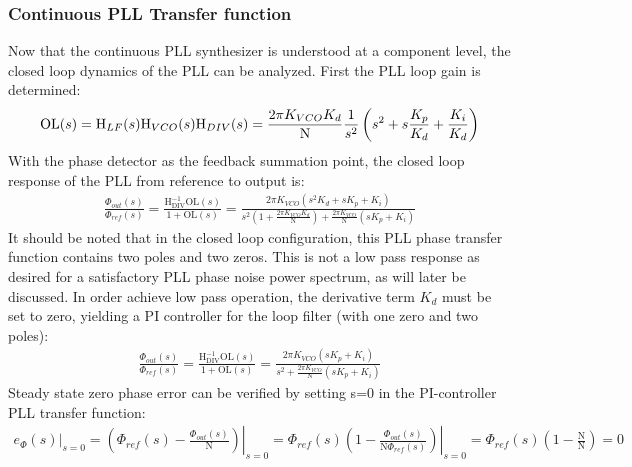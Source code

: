 		\subsubsection{Continuous PLL Transfer function}\label{cont_pll_tf}
			Now that the continuous PLL synthesizer is understood at a component level, the closed loop dynamics of the PLL can be analyzed. First the PLL loop gain is determined:
			\begin{equation}
				\mathrm{OL}(s) = \textnormal{H}_{LF}(s)\textnormal{H}_{VCO}(s)\textnormal{H}_{DIV}(s) = \frac{2\pi K_{VCO}K_d}{\mathrm{N}}\frac{1}{s^2}\left(s^2 + s\frac{K_p}{K_d} + \frac{K_i}{K_d}\right)
			\end{equation}
			With the phase detector as the feedback summation point, the closed loop response of the PLL from reference to output is:
			\begin{align} \label{eq:pid_pll_tf}
				\frac{\Phi_{out}(s)}{\Phi_{ref}(s)} = \frac{\mathrm{H_{DIV}^{-1}OL}(s)}{1 + \mathrm{OL}(s)} = \frac{2\pi K_{VCO}\left(s^2K_d + sK_p + K_i\right)}{s^2\left(1 + \frac{2\pi K_{VCO}K_d}{\mathrm{N}}\right) + \frac{2\pi K_{VCO}}{\mathrm{N}}\left(sK_p + K_i\right)}
			\end{align}
			It should be noted that in the closed loop configuration, this PLL phase transfer function contains two poles and two zeros. This is not a low pass response as desired for a satisfactory PLL phase noise power spectrum, as will later be discussed. In order achieve low pass operation, the derivative term $K_d$ must be set to zero, yielding a PI controller for the loop filter (with one zero and two poles):
			\begin{align} \label{eq:full_pi_pll_tf}
				\frac{\Phi_{out}(s)}{\Phi_{ref}(s)} = \frac{\mathrm{H_{DIV}^{-1}OL}(s)}{1 + \mathrm{OL}(s)} = \frac{2\pi K_{VCO}\left(sK_p + K_i\right)}{s^2 + \frac{2\pi K_{VCO}}{\mathrm{N}}\left(sK_p + K_i\right)}
			\end{align}
			Steady state zero phase error can be verified by setting s=0 in the PI-controller PLL transfer function:
			\begin{align}
				\left.e_\Phi(s)\right\vert_{s=0} = \left.\left(\Phi_{ref}(s) - \frac{\Phi_{out}(s)}{\mathrm{N}}\right)\right\vert_{s=0} = \left.\Phi_{ref}(s)\left(1 - \frac{\Phi_{out}(s)}{\mathrm{N}\Phi_{ref}(s)}\right)\right\vert_{s=0} = \Phi_{ref}(s)\left(1 - \frac{\mathrm{N}}{\mathrm{N}}\right) = 0
			\end{align}

